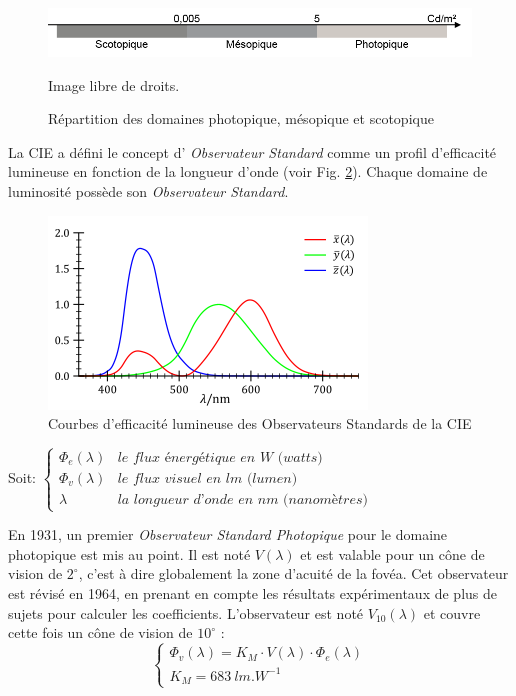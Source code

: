 	\begin{figure}
		\centering
		\includegraphics[scale=1]{Figures/PhotopiqueMesopiqueScotopique}
		\caption{Répartition des domaines photopique, mésopique et scotopique}{Image libre de droits.}
		\label{fig:photopic_mesopic_scotopic}
	\end{figure}		
	
	\par La CIE a défini le concept d' \textit{Observateur Standard} comme un profil d'efficacité lumineuse en fonction de la longueur d'onde (voir Fig. \ref{fig:standard_observer_curves}). Chaque domaine de luminosité possède son \textit{Observateur Standard}.
	
	\begin{figure}
		\centering
		\includegraphics[scale=1]{Figures/StandardObsCurves}
		\caption{Courbes d'efficacité lumineuse des Observateurs Standards de la CIE}
		\label{fig:standard_observer_curves}
	\end{figure}
	
	\par Soit: $\begin{cases}
	\Phi_e(\lambda) & \textit{le flux énergétique en W (watts)}\\
	\Phi_v(\lambda) & \textit{le flux visuel en lm (lumen)}\\
	\lambda & \textit{la longueur d'onde en nm (nanomètres)}
	\end{cases}$
	
	\par En 1931, un premier \textit{Observateur Standard Photopique} pour le domaine photopique est mis au point. Il est noté $V(\lambda)$ et est valable pour un cône de vision de $2^\circ$, c'est à dire globalement la zone d'acuité de la fovéa. Cet observateur est révisé en 1964, en prenant en compte les résultats expérimentaux de plus de sujets pour calculer les coefficients. L'observateur est noté $V_{10}(\lambda)$ et couvre cette fois un cône de vision de $10^\circ$ \citep{le_grand_optique_1972, damelincourt_eclairage_2010}:
	\begin{equation}
		\begin{cases}
		\Phi_v(\lambda) = K_M \cdot V(\lambda) \cdot \Phi_e(\lambda)\\
		K_M = 683~lm.W^{-1}
		\end{cases}
		\label{eq:obs_photopic}
	\end{equation}
	
